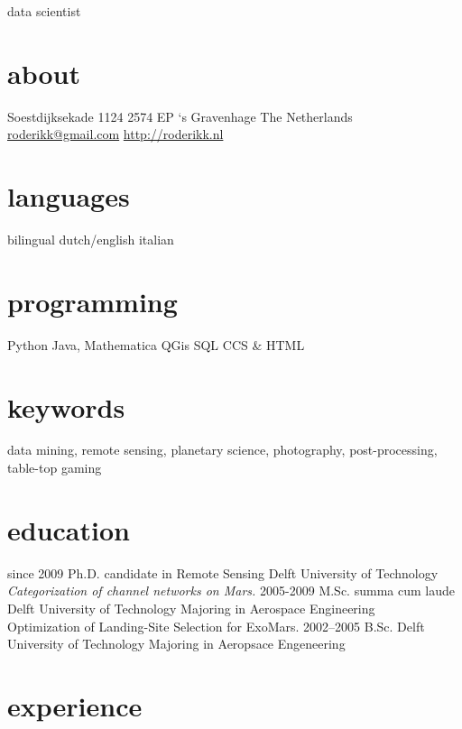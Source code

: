 \documentclass[]{friggeri-cv}
\begin{document}
       {data scientist}


\begin{aside}
  \section{about}
    Soestdijksekade 1124
    2574 EP `s Gravenhage
    The Netherlands
    ~
    \href{mailto:roderikk@gmail.com}{roderikk@gmail.com}
    \href{http://roderikk.nl}{http://roderikk.nl}
  \section{languages}
    bilingual dutch/english
    italian
  \section{programming}
    Python
    Java, Mathematica
    QGis
    SQL
    CCS \& HTML
\end{aside}



\section{keywords}

data mining,
remote sensing,
planetary science,
photography,
post-processing,
table-top gaming

\section{education}

\begin{entrylist}
  \entry
    {since 2009}
    {Ph.D. {\normalfont candidate in Remote Sensing}}
    {Delft University of Technology}
    {\emph{Categorization of channel networks on Mars.}}
  \entry
    {2005-2009}
    {M.Sc. summa cum laude}
    {Delft University of Technology}
    {Majoring in Aerospace Engineering\\
    Optimization of Landing-Site Selection for ExoMars.}
  \entry
    {2002–2005}
    {B.Sc.}
    {Delft University of Technology}
    {Majoring in Aeropsace Engeneering}
\end{entrylist}

\section{experience}
\end{document}
